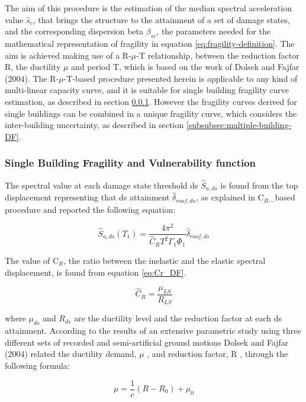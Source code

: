 The aim of this procedure is the estimation of the median spectral acceleration value $\hat{s}_c$, that brings the structure to the attainment of a set of damage states, and the corresponding dispersion beta $\beta_{sc}$, the parameters needed for the mathematical representation of fragility in equation \ref{eq:fragility-definition}. The aim is achieved making use of a R-$\mu$-T relationship, between the reduction factor R, the ductility $\mu$ and period T, which is based on the work of Dolsek and Fajfar (2004). The R-$\mu$-T-based procedure presented herein is applicable to any kind of multi-linear capacity curve, and it is suitable for single building fragility curve estimation, as described in section \ref{subsubsec:single-building-DF}. However the fragility curves derived for single buildings can be combined in a unique fragility curve, which considers the inter-building uncertainty, as described in section \ref{subsubsec:multiple-building-DF}.

\subsubsection{Single Building Fragility and Vulnerability function}
\label{subsubsec:single-building-DF}
The spectral value at each damage state threshold ds $\hat{S}_{a,ds}$ is found from the top displacement representing that ds attainment $\hat{\delta}_{roof, ds}$, as explained in C$_{R}$\_based procedure and reported the following equation:

\begin{equation}
\hat{S}_{a,ds}(T_1) = \frac{4 \pi^2}{\hat{C}_R T^2 \Gamma_1 \Phi_1} \hat{\delta}_{roof, ds}
\label{eq:basic_DF}
\end{equation}

The value of C$_R$, the ratio between the inelastic and the elastic spectral displacement, is found from equation \ref{eq:Cr_DF}.

\begin{equation}
\hat{C}_{R} = \frac{\mu_{LS}}{R_{LS}}
\label{eq:Cr_DF}
\end{equation}

where $\mu_{ds}$ and $R_{ds}$ are the ductility level and the reduction factor at each ds attainment. According to the results of an extensive parametric study using three different sets of recorded and semi-artificial ground motions Dolsek and Fajfar (2004) related the ductility demand, $\mu$ , and reduction factor, R , through the following formula:

\begin{equation}
\label{eq:mu_DF}
\mu = \frac{1}{c} (R-R_{0})+\mu_{0}
\end{equation}


